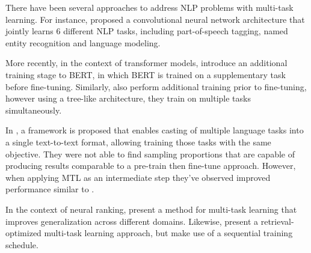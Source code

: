There have been several approaches to address NLP problems with multi-task learning. For instance, \citep{10.1145/1390156.1390177} proposed a convolutional neural network architecture that jointly learns 6 different NLP tasks, including part-of-speech tagging, named entity recognition and language modeling.

More recently, in the context of transformer models, \citet{DBLP:journals/corr/abs-1811-01088} introduce an additional training stage to BERT, in which BERT is trained on a supplementary task before fine-tuning. Similarly, \citet{DBLP:journals/corr/abs-1901-11504} also perform additional training prior to fine-tuning, however using a tree-like architecture, they train on multiple tasks simultaneously.

In \citep{DBLP:journals/corr/abs-1910-10683}, a framework is proposed that enables casting of multiple language tasks into a single text-to-text format, allowing training those tasks with the same objective. They were not able to find sampling proportions that are capable of producing results comparable to a pre-train then fine-tune approach. However, when applying MTL as an intermediate step they've observed improved performance similar to \citet{DBLP:journals/corr/abs-1901-11504}.

In the context of neural ranking, \citet{maillard-etal-2021-multi} present a method for multi-task learning that improves generalization across different domains. Likewise, \citet{Fun2021EfficientRO} present a retrieval-optimized multi-task learning approach, but make use of a sequential training schedule.